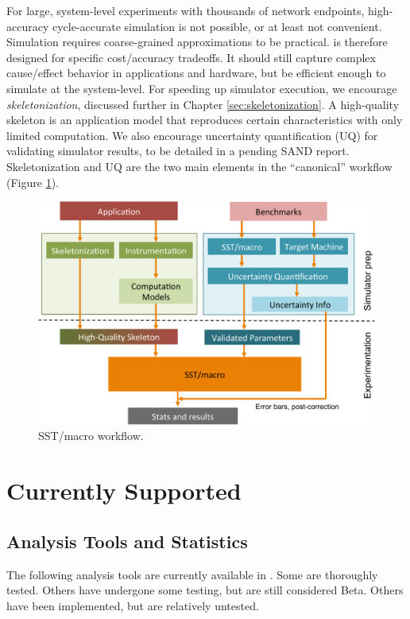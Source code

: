 For large, system-level experiments with thousands of network endpoints, high-accuracy cycle-accurate simulation is not possible,
or at least not convenient.
Simulation requires coarse-grained approximations to be practical.
\sstmacro is therefore designed for specific cost/accuracy tradeoffs.
It should still capture complex cause/effect behavior in applications and hardware, but be efficient enough to simulate at the system-level. 
For speeding up simulator execution, we encourage \textit{skeletonization}, discussed further in Chapter \ref{sec:skeletonization}. 
A high-quality skeleton is an application model that reproduces certain characteristics with only limited computation.  
We also encourage uncertainty quantification (UQ) for validating simulator results,
to be detailed in a pending SAND report.  
Skeletonization and UQ are the two main elements in the ``canonical'' \sstmacro workflow (Figure \ref{fig:workflow}).

\begin{figure}[t]
  \centering
    \includegraphics[width=0.99\columnwidth]{figures/workflow.pdf}
      \caption{SST/macro workflow. }
      \label{fig:workflow}
\end{figure}

\section{Currently Supported}
\label{sec:intro:supported}


\subsection{Analysis Tools and Statistics}
\label{subsec:intro:toolsandstats}
The following analysis tools are currently available in \sstmacro.
Some are thoroughly tested. Others have undergone some testing, but are still considered Beta.  Others have been implemented, but are relatively untested.
